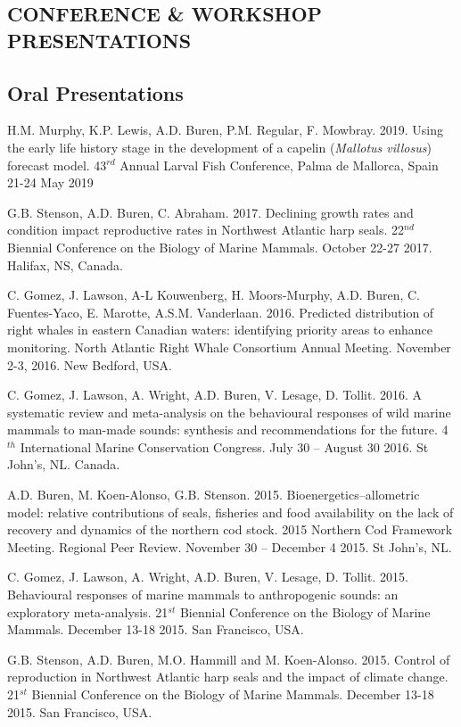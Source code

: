 \documentclass{res}
\begin{document}
\begin{resume}
\pagebreak

\section{CONFERENCE \& WORKSHOP PRESENTATIONS}
\subsection{Oral Presentations}
\begin{hangparas}{.4in}{1}
	
H.M. Murphy, K.P. Lewis, A.D. Buren, P.M. Regular, F. Mowbray. 2019. Using the early life history stage in the development of a capelin (\textit{Mallotus villosus}) forecast model. 43$^{rd}$ Annual Larval Fish Conference, Palma de Mallorca, Spain 21-24 May 2019
	
G.B. Stenson, A.D. Buren, C. Abraham. 2017. Declining growth rates and condition impact reproductive rates in Northwest Atlantic harp seals. 22$^{nd}$ Biennial Conference on the Biology of Marine Mammals. October 22-27 2017. Halifax, NS, Canada.

C. Gomez,  J. Lawson, A-L Kouwenberg, H. Moors-Murphy, A.D. Buren, C. Fuentes-Yaco, E.  Marotte, A.S.M. Vanderlaan. 2016. Predicted distribution of right whales in eastern Canadian waters: identifying priority areas to enhance monitoring. North Atlantic Right Whale Consortium Annual Meeting. November 2-3, 2016. New Bedford, USA.

C. Gomez, J. Lawson, A. Wright, A.D. Buren, V. Lesage, D. Tollit. 2016. A systematic review and meta-analysis on the behavioural responses of wild marine mammals to man-made sounds: synthesis and recommendations for the future. 4$^{th}$ International Marine Conservation Congress. July 30 – August 30 2016. St John's, NL. Canada.

A.D. Buren, M. Koen-Alonso, G.B. Stenson. 2015. Bioenergetics–allometric model: relative contributions of seals, fisheries and food availability on the lack of recovery and dynamics of the northern cod stock. 2015 Northern Cod Framework Meeting. Regional Peer Review. November 30 – December 4 2015. St John's, NL.

C. Gomez, J. Lawson, A. Wright, A.D. Buren, V. Lesage, D. Tollit. 2015. Behavioural responses of marine mammals to anthropogenic sounds: an exploratory meta-analysis. 21$^{st}$ Biennial Conference on the Biology of Marine Mammals. December 13-18 2015. San Francisco, USA.

G.B. Stenson, A.D. Buren, M.O. Hammill and M. Koen-Alonso. 2015. Control of reproduction in Northwest Atlantic harp seals and the impact of climate change. 21$^{st}$ Biennial Conference on the Biology of Marine Mammals. December 13-18 2015. San Francisco, USA.


\end{hangparas}
\end{resume}
\end{document}
